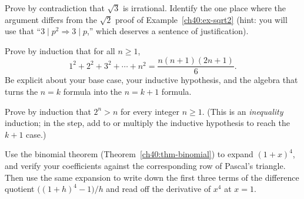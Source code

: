 \begin{exercise}
\label{ch40:exr-contradiction}
Prove by contradiction that $\sqrt 3$ is irrational. Identify the one place where
the argument differs from the $\sqrt 2$ proof of Example~\ref{ch40:ex-sqrt2}
(hint: you will use that ``$3 \mid p^2 \Rightarrow 3 \mid p$,'' which deserves a
sentence of justification).
\end{exercise}

\begin{exercise}
\label{ch40:exr-induction-squares}
Prove by induction that for all $n \ge 1$,
\[
  1^2 + 2^2 + 3^2 + \cdots + n^2 = \frac{n(n+1)(2n+1)}{6}.
\]
Be explicit about your base case, your inductive hypothesis, and the algebra that
turns the $n=k$ formula into the $n=k+1$ formula.
\end{exercise}

\begin{exercise}
\label{ch40:exr-induction-ineq}
Prove by induction that $2^n > n$ for every integer $n \ge 1$. (This is an
\emph{inequality} induction; in the step, add to or multiply the inductive
hypothesis to reach the $k+1$ case.)
\end{exercise}

\begin{exercise}
\label{ch40:exr-binomial}
Use the binomial theorem (Theorem~\ref{ch40:thm-binomial}) to expand $(1+x)^4$,
and verify your coefficients against the corresponding row of Pascal's triangle.
Then use the same expansion to write down the first three terms of the difference
quotient $\bigl((1+h)^4 - 1\bigr)/h$ and read off the derivative of $x^4$ at
$x=1$.
\end{exercise}
